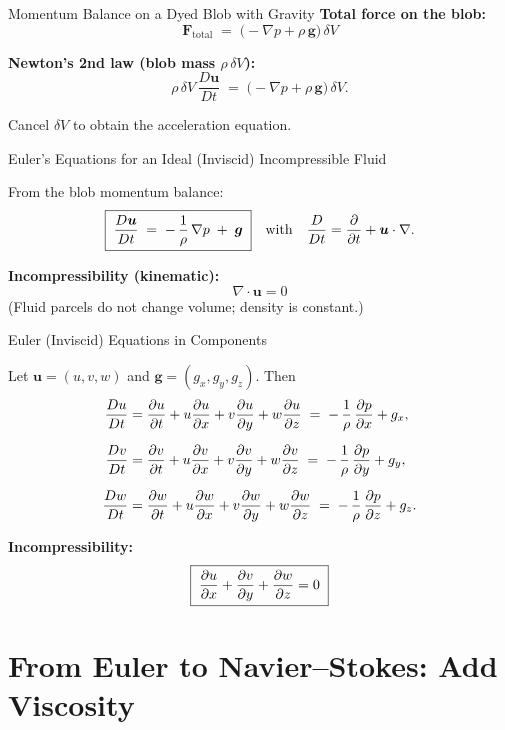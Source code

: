 \documentclass[aspectratio=169]{beamer}
\begin{document}
\begin{frame}{Momentum Balance on a Dyed Blob with Gravity}
\textbf{Total force on the blob:}
\[
\boxed{\;\bm{F}_{\text{total}} \;=\; \big(-\nabla p + \rho\,\bm{g}\big)\,\delta V\;}
\]

\textbf{Newton’s 2nd law (blob mass $\rho\,\delta V$):}
\[
\rho\,\delta V\,\frac{D\bm{u}}{Dt} \;=\; \big(-\nabla p + \rho\,\bm{g}\big)\,\delta V.
\]

Cancel $\delta V$ to obtain the acceleration equation.

\end{frame}

\begin{frame}{Euler’s Equations for an Ideal (Inviscid) Incompressible Fluid}

From the blob momentum balance:
\[
\boxed{\;\frac{D\bm{u}}{Dt} \;=\; -\,\frac{1}{\rho}\,\nabla p \;+\; \bm{g}\;}
\quad\text{with}\quad
\frac{D}{Dt}=\pdv{}{t}+\bm{u}\cdot\nabla.
\]

\medskip
\textbf{Incompressibility (kinematic):}
\[
\boxed{\;\nabla\cdot\bm{u}=0\;}
\]
(Fluid parcels do not change volume; density is constant.)

\end{frame}

\begin{frame}{Euler (Inviscid) Equations in Components}

Let $\bm{u}=(u,v,w)$ and $\bm{g}=(g_x,g_y,g_z)$.
Then
\begin{align*}
\frac{Du}{Dt} &= \pdv{u}{t} + u\pdv{u}{x} + v\pdv{u}{y} + w\pdv{u}{z}
               \;=\; -\,\frac{1}{\rho}\,\pdv{p}{x} + g_x,\\[6pt]
\frac{Dv}{Dt} &= \pdv{v}{t} + u\pdv{v}{x} + v\pdv{v}{y} + w\pdv{v}{z}
               \;=\; -\,\frac{1}{\rho}\,\pdv{p}{y} + g_y,\\[6pt]
\frac{Dw}{Dt} &= \pdv{w}{t} + u\pdv{w}{x} + v\pdv{w}{y} + w\pdv{w}{z}
               \;=\; -\,\frac{1}{\rho}\,\pdv{p}{z} + g_z.
\end{align*}

\medskip
\textbf{Incompressibility:}
\[
\boxed{\;\pdv{u}{x}+\pdv{v}{y}+\pdv{w}{z}=0\;}
\]

\end{frame}


\section{From Euler to Navier--Stokes: Add Viscosity}
\end{document}
